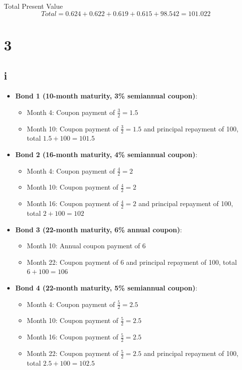 \documentclass{article}
\begin{document}
Total Present Value
\[
    Total = 0.624 + 0.622 + 0.619 + 0.615 + 98.542 = 101.022
\]

\section*{3}
\subsection*{i}
\begin{itemize}
    \item \textbf{Bond 1 (10-month maturity, 3\% semiannual coupon)}:
          \begin{itemize}
              \item Month 4: Coupon payment of \( \frac{3}{2} = 1.5 \)
              \item Month 10: Coupon payment of \( \frac{3}{2} = 1.5 \) and principal repayment of 100, total \( 1.5 + 100 = 101.5 \)
          \end{itemize}

    \item \textbf{Bond 2 (16-month maturity, 4\% semiannual coupon)}:
          \begin{itemize}
              \item Month 4: Coupon payment of \( \frac{4}{2} = 2 \)
              \item Month 10: Coupon payment of \( \frac{4}{2} = 2 \)
              \item Month 16: Coupon payment of \( \frac{4}{2} = 2 \) and principal repayment of 100, total \( 2 + 100 = 102 \)
          \end{itemize}

    \item \textbf{Bond 3 (22-month maturity, 6\% annual coupon)}:
          \begin{itemize}
              \item Month 10: Annual coupon payment of 6
              \item Month 22: Coupon payment of 6 and principal repayment of 100, total \( 6 + 100 = 106 \)
          \end{itemize}

    \item \textbf{Bond 4 (22-month maturity, 5\% semiannual coupon)}:
          \begin{itemize}
              \item Month 4: Coupon payment of \( \frac{5}{2} = 2.5 \)
              \item Month 10: Coupon payment of \( \frac{5}{2} = 2.5 \)
              \item Month 16: Coupon payment of \( \frac{5}{2} = 2.5 \)
              \item Month 22: Coupon payment of \( \frac{5}{2} = 2.5 \) and principal repayment of 100, total \( 2.5 + 100 = 102.5 \)
          \end{itemize}

\end{itemize}
\end{document}

